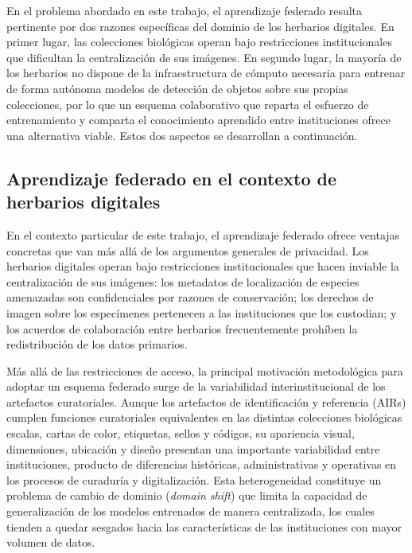 En el problema abordado en este trabajo, el aprendizaje federado resulta pertinente por dos
razones específicas del dominio de los herbarios digitales. En primer lugar, las
colecciones biológicas operan bajo restricciones institucionales que dificultan la
centralización de sus imágenes. En segundo lugar, la mayoría de los herbarios no dispone de
la infraestructura de cómputo necesaria para entrenar de forma autónoma modelos de detección
de objetos sobre sus propias colecciones, por lo que un esquema colaborativo que reparta el
esfuerzo de entrenamiento y comparta el conocimiento aprendido entre instituciones ofrece
una alternativa viable. Estos dos aspectos se desarrollan a continuación.
 
\subsection{Aprendizaje federado en el contexto de herbarios digitales}
 
En el contexto particular de este trabajo, el aprendizaje federado ofrece ventajas
concretas que van más allá de los argumentos generales de privacidad. Los herbarios
digitales operan bajo restricciones institucionales que hacen inviable la centralización
de sus imágenes: los metadatos de localización de especies amenazadas son confidenciales
por razones de conservación; los derechos de imagen sobre los especímenes pertenecen a las
instituciones que los custodian; y los acuerdos de colaboración entre herbarios
frecuentemente prohíben la redistribución de los datos primarios.

Más allá de las restricciones de acceso, la principal motivación metodológica para adoptar
un esquema federado surge de la variabilidad interinstitucional de los artefactos
curatoriales. Aunque los artefactos de identificación y referencia (AIRs) cumplen funciones
curatoriales equivalentes en las distintas colecciones biológicas escalas, cartas de
color, etiquetas, sellos y códigos, su apariencia visual, dimensiones, ubicación y diseño
presentan una importante variabilidad entre instituciones, producto de diferencias
históricas, administrativas y operativas en los procesos de curaduría y digitalización.
Esta heterogeneidad constituye un problema de cambio de dominio (\textit{domain shift}) que
limita la capacidad de generalización de los modelos entrenados de manera centralizada, los
cuales tienden a quedar sesgados hacia las características de las instituciones con mayor
volumen de datos.

